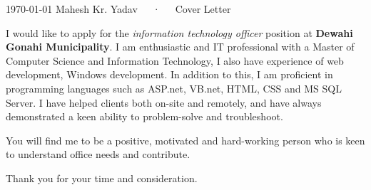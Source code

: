\documentclass[11pt, a4paper]{awesome-cv}
\begin{document}
\makecvheader[C]

\makecvfooter
  {\today}
  {Mahesh Kr. Yadav~~~·~~~Cover Letter}
  {}

\makelettertitle

\begin{cvletter}

I would like to apply for the \textit{information technology officer} position at \textbf{Dewahi Gonahi Municipality}. I am enthusiastic and IT professional with a Master of Computer Science and Information Technology, I also have experience of web development, Windows
development. In addition to this, I am proficient in programming languages such as ASP.net, VB.net, HTML, CSS and MS SQL Server.
I have helped clients both on-site and remotely, and have always demonstrated a keen ability to problem-solve and troubleshoot.

You will find me to be a positive, motivated and hard-working person who is keen to understand office needs and contribute.


Thank you for your time and consideration.

\end{cvletter}


\makeletterclosing
\end{document}

